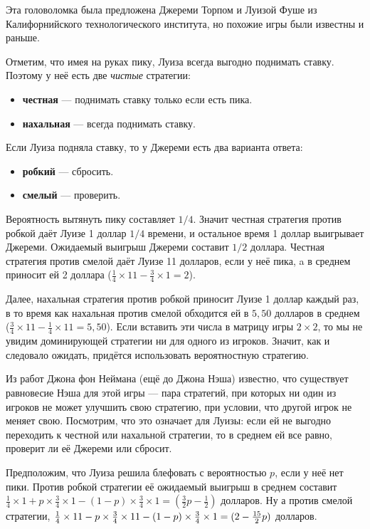 Эта головоломка была предложена Джереми Торпом и Луизой Фуше из Калифорнийского технологического института, но похожие игры были известны и раньше.

Отметим, что имея на руках пику, Луиза всегда выгодно поднимать ставку.
Поэтому у неё есть две \emph{чистые} стратегии:
\begin{itemize}
 \item \textbf{честная} --- поднимать ставку только если есть пика.
 \item \textbf{нахальная} --- всегда поднимать ставку.
\end{itemize}
Если Луиза подняла ставку, то у Джереми есть два варианта ответа:
\begin{itemize}
 \item \textbf{робкий} --- сбросить.
 \item \textbf{смелый} --- проверить.
\end{itemize}

Вероятность вытянуть пику составляет $1/4$.
Значит честная стратегия против робкой даёт Луизе 1 доллар $1/4$ времени, и остальное время 1 доллар выигрывает Джереми.
Ожидаемый выигрыш Джереми составит $1/2$ доллара.
Честная стратегия против смелой даёт Луизе 11 долларов, если у неё пика,
a в среднем приносит ей 2 доллара ($\tfrac14 \times 11 - \tfrac 34 \times 1 = 2$).

Далее, нахальная стратегия против робкой приносит Луизе 1 доллар каждый раз,
в то время как нахальная против смелой обходится ей в $5{,}50$ долларов в среднем ($\tfrac34 \times 11- \tfrac14 \times11 = 5{,}50$).
Если вставить эти числа в матрицу игры $2 \times 2$,
то мы не увидим доминирующей стратегии ни для одного из игроков.
Значит, как и следовало ожидать, придётся использовать вероятностную стратегию.

Из работ Джона фон Неймана (ещё до Джона Нэша) известно, что существует равновесие Нэша для этой игры --- пара стратегий, при которых ни один из игроков не может улучшить свою стратегию, при условии, что другой игрок не меняет свою.
Посмотрим, что это означает для Луизы: если ей не выгодно переходить к честной или нахальной стратегии, то в среднем ей все равно, проверит ли её Джереми или сбросит.

Предположим, что Луиза решила блефовать с вероятностью $p$, если у неё нет пики.
Против робкой стратегии её ожидаемый выигрыш в среднем составит $\tfrac14 \times 1 + p \times \tfrac34 \times 1 - (1 - p) \times \tfrac34 \times 1 =(\tfrac32p - \tfrac12)$ долларов.
Ну а против смелой стратегии, $\tfrac14 \times 11 - p \times \tfrac34 \times 11 - (1 - p) \times \tfrac34 \times 1 \z= (2 - \tfrac{15}2p)$ долларов.

